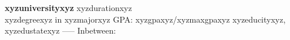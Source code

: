 \item \textbf{xyzuniversityxyz} \hfill xyzdurationxyz \\
xyzdegreexyz in xyzmajorxyz \textbar{} GPA: xyzgpaxyz/xyzmaxgpaxyz \hfill xyzeducityxyz, xyzedustatexyz
-----
Inbetween: \vspace{4pt}
